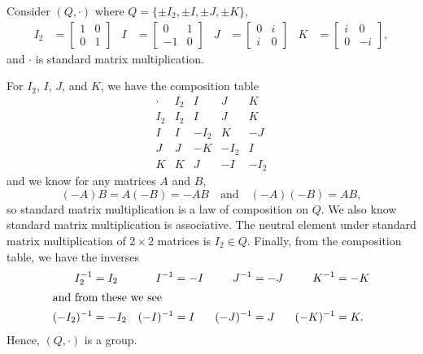 \begin{exer}
Consider $ (Q,\cdot) $ where $ Q=\{\pm I_2,\pm I,\pm J,\pm K\} $,
\begin{align*}
    I_2&=
    \begin{bmatrix}
        1 & 0 \\
        0 & 1
    \end{bmatrix}
    &
    I&=
    \begin{bmatrix}
        0 & 1 \\
        -1 & 0
    \end{bmatrix}
    &
    J&=
    \begin{bmatrix}
        0 & i \\
        i & 0
    \end{bmatrix}
    &
    K&=
    \begin{bmatrix}
        i & 0 \\
        0 & -i
    \end{bmatrix},
\end{align*}
and $ \cdot $ is standard matrix multiplication.
\end{exer}
\begin{sltn}
For $ I_2 $, $ I $, $ J $, and $ K $, we have the composition table
\begin{equation*}
    \begin{array}{c|cccc}
        \cdot & I_2  & I    & J    & K    \\
        \hline
        I_2   & I_2  & I    & J    & K    \\
        I     & I    & -I_2 & K    & -J   \\
        J     & J    & -K   & -I_2 & I    \\
        K     & K    & J    & -I   & -I_2
    \end{array}
\end{equation*}
and we know for any matrices $ A $ and $ B $,
\begin{equation*}
    (-A)B=A(-B)=-AB \quad\text{and}\quad (-A)(-B)=AB,
\end{equation*}
so standard matrix multiplication is a law of composition on $ Q $. We also know standard matrix multiplication is associative. The neutral element under standard matrix multiplication of $ 2\times 2 $ matrices is $ I_2\in Q $. Finally, from the composition table, we have the inverses
\begin{align*}
    I_2^{-1}&=I_2 & I^{-1}&=-I & J^{-1}&=-J & K^{-1}&=-K \\
    \intertext{and from these we see}
    (-I_2)^{-1}&=-I_2 & (-I)^{-1}&=I & (-J)^{-1}&=J & (-K)^{-1}&=K.
\end{align*}
Hence, $ (Q,\cdot) $ is a group.
\end{sltn}

